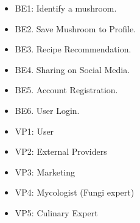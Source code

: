 \documentclass{article}
\begin{document}
\begin{itemize}
	\item BE1: Identify a mushroom.
 	\item BE2. Save Mushroom to Profile.
 	\item BE3. Recipe Recommendation.
 	\item BE4. Sharing on Social Media.
 	\item BE5. Account Registration.
 	\item BE6. User Login.
\end{itemize}

\newpage
{} 

\begin{itemize}
	\item VP1: User
	\item VP2: External Providers
	\item VP3: Marketing
	\item VP4: Mycologist (Fungi expert)
	\item VP5: Culinary Expert
\end{itemize}
\end{document}
